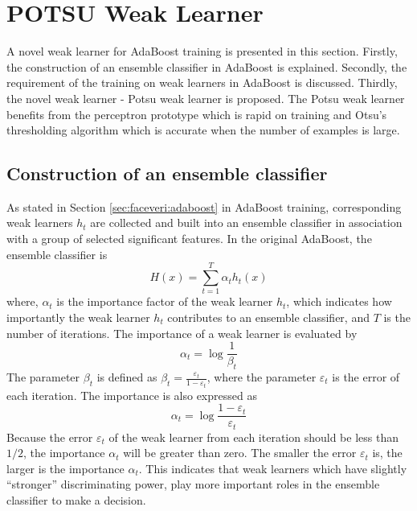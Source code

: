 
\section{POTSU Weak Learner}
\label{sec:POTSU}
A novel weak learner for AdaBoost training is presented in this section. Firstly, the construction of an ensemble classifier in AdaBoost is explained. Secondly, the requirement of the training on weak learners in AdaBoost is discussed. Thirdly, the novel weak learner - Potsu weak learner is proposed. The Potsu weak learner benefits from the perceptron prototype which is rapid on training and Otsu's thresholding algorithm which is accurate when the number of examples is large.

\subsection{Construction of an ensemble classifier}
As stated in \mbox{Section} \ref{sec:faceveri:adaboost} in AdaBoost training, corresponding weak learners $h_{t}$ are collected and built into an ensemble classifier in association with a group of selected significant features. In the original AdaBoost, the ensemble classifier is 
\begin{displaymath}
 H(x)  =  \sum_{t=1}^{T}\alpha_{t}h_{t}(x)
\end{displaymath}
where, $\alpha_{t}$ is the importance factor of the weak learner $h_{t}$, which indicates how importantly the weak learner $h_{t}$ contributes to an ensemble classifier, and $T$ is the number of iterations. The importance of a weak learner is evaluated by
\begin{equation}
 \alpha_{t} = \log \frac{1}{\beta_{t}}
\end{equation}
The parameter $\beta_{t}$ is defined as $\beta_{t}=\frac{\varepsilon_{t}}{1-\varepsilon_{t}}$, where the parameter $\varepsilon_{t}$ is the error of each iteration. The importance is also expressed as
\begin{displaymath}
 \alpha_{t} = \log \frac{1-\varepsilon_{t}}{\varepsilon_{t}}
\end{displaymath}
Because the error $\varepsilon_{t}$ of the weak learner from each iteration should be less than $1/2$, the importance $\alpha_{t}$ will be greater than zero. The smaller the error $\varepsilon_{t}$ is, the larger is the importance $\alpha_{t}$. This indicates that weak learners which have slightly ``stronger'' discriminating power, play more important roles in the ensemble classifier to make a decision.

